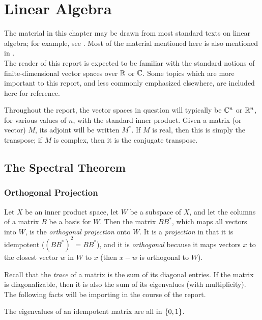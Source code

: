 \documentclass{report}
\begin{document}
\chapter{Linear Algebra}

  The material in this chapter may be drawn from most standard texts on linear
  algebra; for example, see \cite{fis}.  Most of the material mentioned here is
  also mentioned in \cite[Sections 2.5, 2.6; and the Appendix]{godsil}.
  \\

  The reader of this report is expected to be familiar with the standard notions
  of finite-dimensional vector spaces over $\mathbb{R}$ or $\mathbb{C}$.  Some topics which are
  more important to this report, and less commonly emphasized elsewhere, are
  included here for reference.

  Throughout the report, the vector spaces in question will typically be $\mathbb{C}^n$
  or $\mathbb{R}^n$, for various values of $n$, with the standard inner product.  Given
  a matrix (or vector) $M$, its adjoint will be written $M^*$.  If $M$ is real,
  then this is simply the transpose; if $M$ is complex, then it is the conjugate
  transpose.

  \section{The Spectral Theorem}
    \subsection{Orthogonal Projection}

      Let $X$ be an inner product space, let $W$ be a subspace of $X$, and let
      the columns of a matrix $B$ be a basis for $W$.  Then the matrix $BB^*$,
      which maps all vectors into $W$, is the \textit{orthogonal projection}
      onto $W$.  It is a \textit{projection} in that it is idempotent ($(BB^*)^2
      = BB^*$), and it is \textit{orthogonal} because it maps vectors $x$ to the
      closest vector $w$ in $W$ to $x$ (then $x - w$ is orthogonal to $W$).

      Recall that the \textit{trace} of a matrix is the sum of its diagonal
      entries.  If the matrix is diagonalizable, then it is also the sum of its
      eigenvalues (with multiplicity).  The following facts will be importing in
      the course of the report.

      \begin{lem}
        The eigenvalues of an idempotent matrix are all in $\left\lbrace 0, 1 \right\rbrace$.
      \end{lem}
\end{document}

